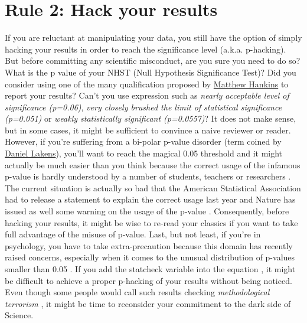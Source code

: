 \documentclass[a4paper,10pt,onecolumn]{article}
\begin{document}
\section*{Rule 2: Hack your results}

If you are reluctant at manipulating your data, you still have the option of
simply hacking your results in order to reach the significance level
(a.k.a. p-hacking). But before committing any scientific misconduct, are you
sure you need to do so? What is the p value of your NHST (Null Hypothesis
Significance Test)? Did you consider using one of the many qualification
proposed by
\href{https://mchankins.wordpress.com/2013/04/21/still-not-significant-2/}{Matthew
  Hankins} to report your results? Can't you use expression such as {\em nearly
  acceptable level of significance (p=0.06)}, {\em very closely brushed the
  limit of statistical significance (p=0.051)} or {\em weakly statistically
  significant (p=0.0557)}? It does not make sense, but in some cases, it might
be sufficient to convince a naive reviewer or reader. However, if you're
suffering from a bi-polar p-value disorder (term coined by
\href{http://daniellakens.blogspot.fr/2014/05/the-probability-of-p-values-as-function.html}{Daniel
  Lakens}), you'll want to reach the magical 0.05 threshold and it might
actually be much easier than you think because the correct usage of the
infamous p-value is hardly understood by a number of students, teachers or
researchers \citep{haller:2002,lecoutre:2003}. The current situation is
actually so bad that the American Statistical Association had to release a
statement to explain the correct usage \citep{wasserstein:2016,} last year and
Nature has issued as well some warning on the usage of the p-value
\citep{baker:2016}. Consequently, before hacking your results, it might be wise
to re-read your classics
\citep{simmons:2011,cumming:2012a,cumming:2012b,colquhoun:2014} if you want to
take full advantage of the misuse of p-value. Last, but not least, if you're in
psychology, you have to take extra-precaution because this domain has recently
raised concerns, especially when it comes to the unusual distribution of
p-values smaller than 0.05 \citep{hartgerink:2016,bakker:2012}. If you add the
statcheck variable into the equation \citep{nuijten:2015,epskamp:2016}, it
might be difficult to achieve a proper p-hacking of your results without being
noticed. Even though some people would call such results checking {\em
  methodological terrorism} \citep{finske:2016}, it might be time to reconsider
your commitment to the dark side of Science.
\end{document}
